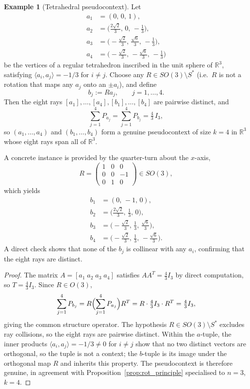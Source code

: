\documentclass[
  twocolumn,
  aps,
  pra,
  floatfix,
  amsmath,amssymb,
  longbibliography
]{revtex4-2}
\theoremstyle{definition}
\newtheorem{example}[theorem]{Example}
\theoremstyle{remark}
\begin{document}
\begin{example}[Tetrahedral pseudocontext]\label{ex:tetrahedron}
Let
\begin{align*}
  a_1 &= (0,\,0,\,1),\\
  a_2 &= \bigl(\tfrac{2\sqrt{2}}{3},\,0,\,-\tfrac{1}{3}\bigr),\\
  a_3 &= \bigl(-\tfrac{\sqrt{2}}{3},\,\tfrac{\sqrt{6}}{3},\,-\tfrac{1}{3}\bigr),\\
  a_4 &= \bigl(-\tfrac{\sqrt{2}}{3},\,-\tfrac{\sqrt{6}}{3},\,-\tfrac{1}{3}\bigr)
\end{align*}
be the vertices of a regular tetrahedron inscribed in the unit
sphere of $\mathbb{R}^3$, satisfying $\langle a_i,a_j\rangle=-1/3$
for $i\neq j$.  Choose any $R\in SO(3)\setminus S^{*}$ (i.e.\ $R$ is
not a rotation that maps any $a_j$ onto an $\pm a_i$), and define
\[
  b_j:=Ra_j,\qquad j=1,\ldots,4.
\]
Then the eight rays
$[a_1],\ldots,[a_4],[b_1],\ldots,[b_4]$ are pairwise distinct, and
\[
  \sum_{j=1}^{4}P_{a_j}=\sum_{j=1}^{4}P_{b_j}=\tfrac{4}{3}\,I_3,
\]
so $(a_1,\ldots,a_4)$ and $(b_1,\ldots,b_4)$ form a genuine
pseudocontext of size $k=4$ in $\mathbb{R}^3$ whose eight rays span
all of $\mathbb{R}^3$.

A concrete instance is provided by the quarter-turn about the
$x$-axis,
\[
  R=\begin{pmatrix} 1 & 0 & 0\\ 0 & 0 & -1\\ 0 & 1 & 0 \end{pmatrix}
   \in SO(3),
\]
which yields
\begin{align*}
  b_1 &= (0,\,-1,\,0),\\
  b_2 &= \bigl(\tfrac{2\sqrt{2}}{3},\,\tfrac{1}{3},\,0\bigr),\\
  b_3 &= \bigl(-\tfrac{\sqrt{2}}{3},\,\tfrac{1}{3},\,\tfrac{\sqrt{6}}{3}\bigr),\\
  b_4 &= \bigl(-\tfrac{\sqrt{2}}{3},\,\tfrac{1}{3},\,-\tfrac{\sqrt{6}}{3}\bigr).
\end{align*}
A direct check shows that none of the $b_j$ is collinear with any
$a_i$, confirming that the eight rays are distinct.
\end{example}

\begin{proof}
The matrix $A=[a_1\;a_2\;a_3\;a_4]$ satisfies $AA^{T}=\tfrac{4}{3}I_3$
by direct computation, so $T=\tfrac{4}{3}I_3$.  Since $R\in O(3)$,
\[
  \sum_{j=1}^{4}P_{b_j}=R\Bigl(\sum_{j=1}^{4}P_{a_j}\Bigr)R^{T}
  =R\cdot\tfrac{4}{3}I_3\cdot R^{T}=\tfrac{4}{3}I_3,
\]
giving the common structure operator.  The hypothesis
$R\in SO(3)\setminus S^{*}$ excludes ray collisions, so the eight
rays are pairwise distinct.  Within the $a$-tuple, the inner products
$\langle a_i,a_j\rangle=-1/3\neq 0$ for $i\neq j$ show that no two
distinct vectors are orthogonal, so the tuple is not a context; the
$b$-tuple is its image under the orthogonal map $R$ and inherits
this property.  The pseudocontext is therefore genuine, in agreement
with Proposition~\ref{prop:rot_principle} specialised to $n=3$,
$k=4$.
\end{proof}
\end{document}
